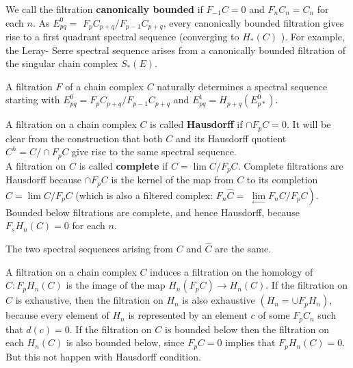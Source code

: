 \begin{example}
\begin{example}
We call the filtration \textbf{canonically bounded} if $F_{-1} C=0$ and $F_n C_n=C_n$ for each $n$. As $E_{p q}^0=$ $F_p C_{p+q} / F_{p-1} C_{p+q}$, every canonically bounded filtration gives rise to a first quadrant spectral sequence (converging to $H_*(C)$ ). For example, the Leray- Serre spectral sequence arises from a canonically bounded filtration of the singular chain complex $S_*(E)$. %
\end{example}

\begin{theo}
A filtration $F$ of a chain complex $C$ naturally determines a spectral sequence starting with $E_{p q}^0=F_p C_{p+q} / F_{p-1} C_{p+q}$ and $E_{p q}^1=H_{p+q}\left(E_{p *}^0\right)$.    
\end{theo}

A filtration on a chain complex $C$ is called \textbf{Hausdorff} if $\cap F_p C=0$. It will be clear from the construction that both $C$ and its Hausdorff quotient $C^h=C / \cap F_p C$ give rise to the same spectral sequence.\\
A filtration on $C$ is called \textbf{complete} if $C=\lim C / F_p C$. Complete filtrations are Hausdorff because $\cap F_p C$ is the kernel of the map from $C$ to its completion $\widehat{C}=\operatorname{\operatorname {lim}} C / F_p C$ (which is also a filtered complex: $F_n \widehat{C}=$ $\left.\underset{\longleftarrow}{\lim } F_n C / F_p C\right)$. \\
Bounded below filtrations are complete, and hence Hausdorff, because $F_s H_n(C)=0$ for each $n$.

\begin{coro}
The two spectral sequences arising from $C$ and $\widehat{C}$ are the same.    
\end{coro}

A filtration on a chain complex $C$ induces a filtration on the homology of $C: F_p H_n(C)$ is the image of the map $H_n\left(F_p C\right) \rightarrow H_n(C)$. If the filtration on $C$ is exhaustive, then the filtration on $H_n$ is also exhaustive $\left(H_n=\cup F_p H_n\right)$, because every element of $H_n$ is represented by an element $c$ of some $F_p C_n$ such that $d(c)=0$. If the filtration on $C$ is bounded below then the filtration on each $H_n(C)$ is also bounded below, since $F_p C=0$ implies that $F_p H_n(C)=0$. But this not happen with Hausdorff condition.


\end{example}
